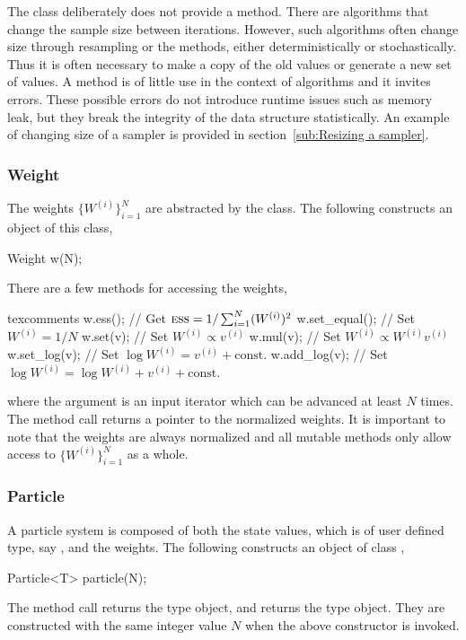 \documentclass[11pt,bib,mint,hyper,altcolor]{marticle}
\begin{document}
The  class deliberately does not provide a
 method. There are algorithms that change the sample size
between iterations. However, such algorithms often change size through
resampling or the methods, either deterministically or stochastically. Thus it
is often necessary to make a copy of the old values or generate a new set of
values. A  method is of little use in the context of \smc
algorithms and it invites errors. These possible errors do not introduce
runtime issues such as memory leak, but they break the integrity of the data
structure statistically. An example of changing size of a sampler is provided
in section~\ref{sub:Resizing a sampler}.

\subsubsection{Weight}
\label{ssub:Weight}

The weights $\{W^{(i)}\}_{i=1}^N$ are abstracted by the 
class. The following constructs an object of this class,
\begin{cppcode}
  Weight w(N);
\end{cppcode}
There are a few methods for accessing the weights,
\begin{cppcode*}{texcomments}
  w.ess();       // Get $\text{\normalfont\textsc{ess}} = 1/\sum_{i=1}^N(W^{(i)})^2$
  w.set_equal(); // Set $W^{(i)} = 1/N$
  w.set(v);      // Set $W^{(i)} \propto v^{(i)}$
  w.mul(v);      // Set $W^{(i)} \propto W^{(i)} v^{(i)}$
  w.set_log(v);  // Set $\log W^{(i)} = v^{(i)} + \text{const.}$
  w.add_log(v);  // Set $\log W^{(i)} = \log W^{(i)} + v^{(i)} + \text{const.}$
\end{cppcode*}
where the argument  is an input iterator which can be advanced at
least $N$ times. The method call  returns a pointer to the
normalized weights. It is important to note that the weights are always
normalized and all mutable methods only allow access to $\{W^{(i)}\}_{i=1}^N$
as a whole.

\subsubsection{Particle}
\label{ssub:Particle}

A particle system is composed of both the state values, which is of user
defined type, say , and the weights. The following constructs an
object of class ,
\begin{cppcode}
  Particle<T> particle(N);
\end{cppcode}
The method call  returns the type 
object, and  returns the type 
object. They are constructed with the same integer value $N$ when the above
constructor is invoked.
\end{document}
